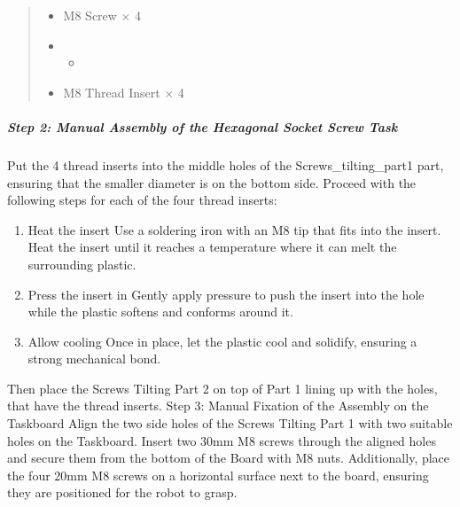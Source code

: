\documentclass[letterpaper,10pt,english]{sphinxmanual}
\begin{document}
\begin{quote}
\begin{itemize}
\end{itemize}
\begin{itemize}
\item {} 
\sphinxAtStartPar
20mm M8 Screw × 4

\end{itemize}
\begin{itemize}
\item {} \begin{itemize}
\item {} 
\end{itemize}

\end{itemize}
\begin{itemize}
\item {} 
\sphinxAtStartPar
M8 Thread Insert × 4

\end{itemize}
\end{quote}


\subparagraph{Step 2: Manual Assembly of the Hexagonal Socket Screw Task}
\label{\detokenize{4-Assembly-Instructions-Screws-and-Nuts:id4}}
\sphinxAtStartPar
Put the 4 thread inserts into the middle holes of the Screws\_tilting\_part1 part, ensuring that the smaller diameter is on the bottom side.
Proceed with the following steps for each of the four thread inserts:
\begin{enumerate}
%
\item {} 
\sphinxAtStartPar
Heat the insert \textendash{} Use a soldering iron with an M8 tip that fits into the insert. Heat the insert until it reaches a temperature where it can melt the surrounding plastic.

\item {} 
\sphinxAtStartPar
Press the insert in \textendash{} Gently apply pressure to push the insert into the hole while the plastic softens and conforms around it.

\item {} 
\sphinxAtStartPar
Allow cooling \textendash{} Once in place, let the plastic cool and solidify, ensuring a strong mechanical bond.

\end{enumerate}

\sphinxAtStartPar
Then place the Screws Tilting Part 2 on top of Part 1 lining up with the holes, that have the thread inserts. Step 3: Manual Fixation of the Assembly on the Taskboard Align the two side holes of the Screws Tilting Part 1 with two suitable holes on the Taskboard. Insert two 30mm M8 screws through the aligned holes and secure them from the bottom of the Board with M8 nuts.
Additionally, place the four 20mm M8 screws on a horizontal surface next to the board, ensuring they are positioned for the robot to grasp.
\end{document}
